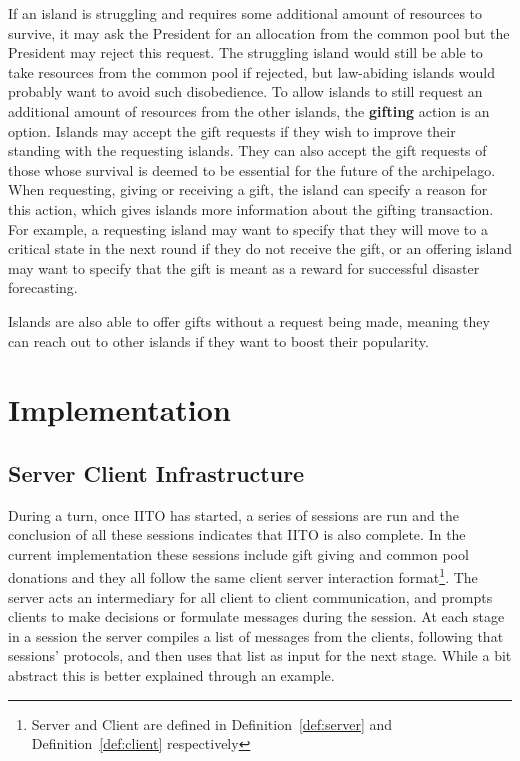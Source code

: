 If an island is struggling and requires some additional amount of resources to survive, it may ask the President for an allocation from the common pool but the President may reject this request. The struggling island would still be able to take resources from the common pool if rejected, but law-abiding islands would probably want to avoid such disobedience. To allow islands to still request an additional amount of resources from the other islands, the \textbf{gifting} action is an option. Islands may accept the gift requests if they wish to improve their standing with the requesting islands. They can also accept the gift requests of those whose survival is deemed to be essential for the future of the archipelago. When requesting, giving or receiving a gift, the island can specify a reason for this action, which gives islands more information about the gifting transaction. For example, a requesting island may want to specify that they will move to a critical state in the next round if they do not receive the gift, or an offering island may want to specify that the gift is meant as a reward for successful disaster forecasting.

Islands are also able to offer gifts without a request being made, meaning they can reach out to other islands if they want to boost their popularity.

\section{Implementation}
\label{sec:IITO:Implementation}

\subsection{Server Client Infrastructure}
\label{subsec:IITO:server_client_infrastructure}  

During a turn, once IITO has started, a series of sessions are run and the conclusion of all these sessions indicates that IITO is also complete. In the current implementation these sessions include gift giving and common pool donations and they all follow the same client server interaction format\footnote{Server and Client are defined in Definition~\ref{def:server} and Definition~\ref{def:client} respectively}. The server acts an intermediary for all client to client communication, and prompts clients to make decisions or formulate messages during the session. At each stage in a session the server compiles a list of messages from the clients, following that sessions' protocols, and then uses that list as input for the next stage. While a bit abstract this is better explained through an example.


